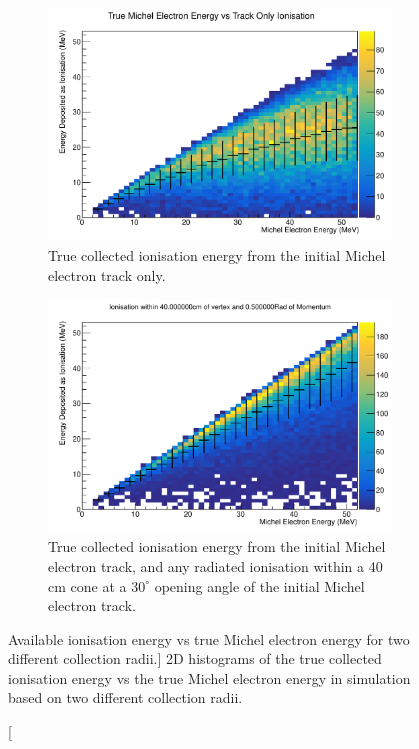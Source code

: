 \begin{figure}
	\centering

	\begin{subfigure}[b]{\textwidth}
		\includegraphics[clip, trim = 0cm 0cm 0cm 1cm, width=\textwidth]{figures/michel_track_only.pdf}
		\caption
		{True collected ionisation energy from the initial Michel electron track
		only.}
		\label{fig:track_only}
	\end{subfigure}

	\vspace{5mm}

	\begin{subfigure}[b]{\textwidth}
		\includegraphics[clip, trim = 0cm 0cm 0cm 1cm, width=\textwidth]{figures/cone_reco.pdf}
		\caption
		{True collected ionisation energy from the initial Michel electron track,
		and any radiated ionisation within a 40 cm cone at a $30^\circ$ opening
		angle of the initial Michel electron track.}
		\label{fig:cone_reco}
	\end{subfigure}

	\caption
	[Available ionisation energy vs true Michel electron energy for two different
	collection radii.]
	{2D histograms of the true collected ionisation energy vs the true Michel
	electron energy in \protodune{} simulation based on two different collection
	radii.}

	\label{fig:michel_track_only}

\end{figure}

